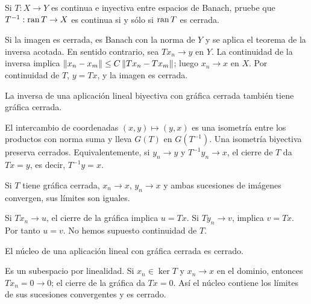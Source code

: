 \begin{ejercicio}\label{ej:v3-l03-4}
Si $T:X\to Y$ es continua e inyectiva entre espacios de Banach, pruebe que $T^{-1}:\operatorname{ran} T\to X$ es continua si y sólo si $\operatorname{ran} T$ es cerrada.
\end{ejercicio}
\begin{solucion}
Si la imagen es cerrada, es Banach con la norma de $Y$ y se aplica el teorema de la inversa acotada. En sentido contrario, sea $Tx_n\to y$ en $Y$. La continuidad de la inversa implica $\left\lVert x_n-x_m\right\rVert\le C\left\lVert Tx_n-Tx_m\right\rVert$; luego $x_n\to x$ en $X$. Por continuidad de $T$, $y=Tx$, y la imagen es cerrada.
\end{solucion}

\begin{ejercicio}\label{ej:v3-l03-5}
La inversa de una aplicación lineal biyectiva con gráfica cerrada también tiene gráfica cerrada.
\end{ejercicio}
\begin{solucion}
El intercambio de coordenadas $(x,y)\mapsto(y,x)$ es una isometría entre los productos con norma suma y lleva $G(T)$ en $G(T^{-1})$. Una isometría biyectiva preserva cerrados. Equivalentemente, si $y_n\to y$ y $T^{-1}y_n\to x$, el cierre de $T$ da $Tx=y$, es decir, $T^{-1}y=x$.
\end{solucion}

\begin{ejercicio}\label{ej:v3-l03-6}
Si $T$ tiene gráfica cerrada, $x_n\to x$, $y_n\to x$ y ambas sucesiones de imágenes convergen, sus límites son iguales.
\end{ejercicio}
\begin{solucion}
Si $Tx_n\to u$, el cierre de la gráfica implica $u=Tx$. Si $Ty_n\to v$, implica $v=Tx$. Por tanto $u=v$. No hemos supuesto continuidad de $T$.
\end{solucion}

\begin{ejercicio}\label{ej:v3-l03-7}
El núcleo de una aplicación lineal con gráfica cerrada es cerrado.
\end{ejercicio}
\begin{solucion}
Es un subespacio por linealidad. Si $x_n\in\ker T$ y $x_n\to x$ en el dominio, entonces $Tx_n=0\to0$; el cierre de la gráfica da $Tx=0$. Así el núcleo contiene los límites de sus sucesiones convergentes y es cerrado.
\end{solucion}

